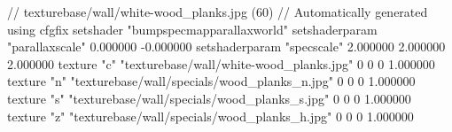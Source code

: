 // texturebase/wall/white-wood_planks.jpg (60)
// Automatically generated using cfgfix
setshader "bumpspecmapparallaxworld"
setshaderparam "parallaxscale" 0.000000 -0.000000
setshaderparam "specscale" 2.000000 2.000000 2.000000
texture "c" "texturebase/wall/white-wood_planks.jpg" 0 0 0 1.000000
texture "n" "texturebase/wall/specials/wood_planks_n.jpg" 0 0 0 1.000000
texture "s" "texturebase/wall/specials/wood_planks_s.jpg" 0 0 0 1.000000
texture "z" "texturebase/wall/specials/wood_planks_h.jpg" 0 0 0 1.000000
